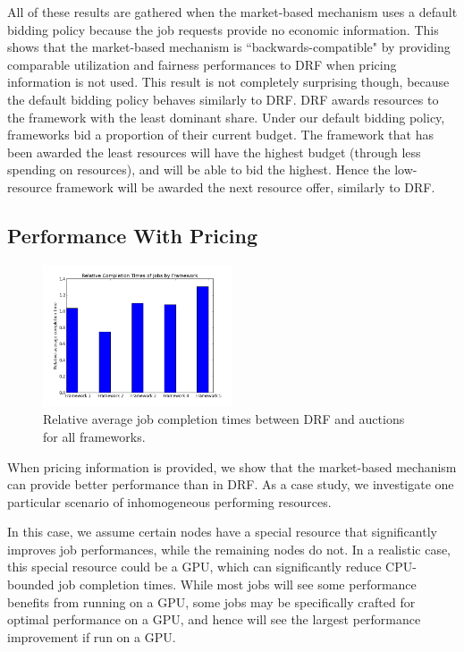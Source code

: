 \documentclass{acm_proc_article-sp}
\begin{document}
All of these results are gathered when the market-based mechanism uses a default bidding policy because the job requests provide no economic information. This shows that the market-based mechanism is ``backwards-compatible" by providing comparable utilization and fairness performances to DRF when pricing information is not used. This result is not completely surprising though, because the default bidding policy behaves similarly to DRF. DRF awards resources to the framework with the least dominant share. Under our default bidding policy, frameworks bid a proportion of their current budget. The framework that has been awarded the least resources will have the highest budget (through less spending on resources), and will be able to bid the highest. Hence the low-resource framework will be awarded the next resource offer, similarly to DRF.

\subsection{Performance With Pricing}


\begin{figure}

\includegraphics[width=0.5\textwidth]{images/relative_completion_times.png}
\caption{Relative average job completion times between DRF and auctions for all frameworks.}
\label{img:relative}
\end{figure}

When pricing information is provided, we show that the market-based mechanism can provide better performance than in DRF. As a case study, we investigate one particular scenario of inhomogeneous performing resources. 

In this case, we assume certain nodes have a special resource that significantly improves job performances, while the remaining nodes do not. In a realistic case, this special resource could be a GPU, which can significantly reduce CPU-bounded job completion times. While most jobs will see some performance benefits from running on a GPU, some jobs may be specifically crafted for optimal performance on a GPU, and hence will see the largest performance improvement if run on a GPU.
\end{document}
